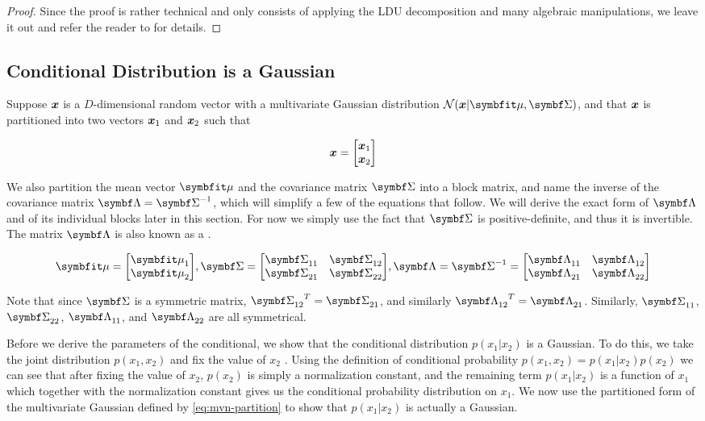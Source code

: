 \begin{proof}
  Since the proof is rather technical and only consists of applying the
  LDU decomposition and many algebraic manipulations, we leave it out and
  refer the reader to \cite{murphy2012machine} for details.
\end{proof}


\subsection{Conditional Distribution is a Gaussian}

Suppose ${\boldsymbol{x}}$ is a $D$-dimensional random vector with a multivariate Gaussian distribution
$\gN(\vx | \vmu, \mSigma)$, and that ${\boldsymbol{x}}$ is partitioned into two vectors
${\boldsymbol{x}}_1$ and ${\boldsymbol{x}}_2$ such that

\begin{equation}
  {\boldsymbol{x}} = {\begin{bmatrix} {\boldsymbol{x}}_1 \\ {\boldsymbol{x}}_2 \end{bmatrix}}
\end{equation}

We also partition the mean vector $\vmu$ and the covariance matrix $\mSigma$
into a block matrix, and name the inverse of the covariance matrix $\mLambda =
\mSigma^{-1}$, which will simplify a few of the equations that follow. We will
derive the exact form of $\mLambda$ and of its individual blocks later in this
section. For now we simply use the fact that $\mSigma$ is positive-definite,
and thus it is invertible. The matrix $\mLambda$ is also known as a
.

\begin{equation}
  \vmu = \partmu,
  \mSigma = \partsigma, \mLambda = \mSigma^{-1} = \partlambda \label{eq:mvn-partition}
\end{equation}

Note that since $\mSigma$ is a symmetric matrix, $\ms{12}^T = \ms{21}$, and
similarly $\ml{12}^T = \ml{21}$. Similarly, $\ms{11}$, $\ms{22}$, $\ml{11}$,
and $\ml{22}$ are all symmetrical.

Before we derive the parameters of the conditional, we show that the
conditional distribution $p(x_1 | x_2)$ is a Gaussian. To do this, we take the
joint distribution $p(x_1, x_2)$ and fix the value of $x_2$
\citep{bishop2016pattern}. Using the definition of conditional probability
$p(x_1, x_2) = p(x_1 | x_2) p(x_2)$ we can see that after fixing the value of
$x_2$, $p(x_2)$ is simply a normalization constant, and the remaining term
$p(x_1 | x_2)$ is a function of $x_1$ which together with the normalization
constant gives us the conditional probability distribution on $x_1$.
We now use the partitioned form of the multivariate Gaussian defined by
\eqref{eq:mvn-partition} to show that $p(x_1 | x_2)$ is actually a Gaussian.

